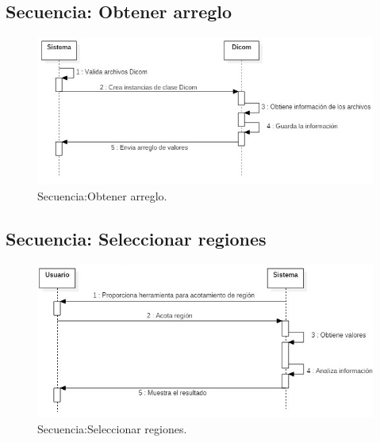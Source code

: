 \documentclass[12pt]{report}
\begin{document}
\subsection{Secuencia: Obtener arreglo}
\begin{figure}[H]
\centering
\includegraphics[width = 12 cm, height = 7 cm]{obtener_arreglo}
\caption{Secuencia:Obtener arreglo.}
\end{figure}

\subsection{Secuencia: Seleccionar regiones}
\begin{figure}[H]
\centering
\includegraphics[width = 12 cm, height = 7 cm]{region}
\caption{Secuencia:Seleccionar regiones.}
\end{figure}
\end{document}
